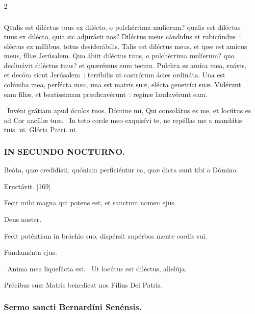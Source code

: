 \documentclass[9pt,twoside]{extarticle}
\begin{document}
\begin{multicols}{2}
{\subsubsection*{\center {}}
\lettrine{Q}ualis est diléctus tuus ex dilécto, o pulchérrima mulíerum? qualis est diléctus tuus ex dilécto, quia sic adjurásti nos?
Diléctus meus cándidus et rubicúndus~: eléctus ex míllibus, totus desiderábilis. Talis est diléctus meus, et ipse est amícus meus, fíliæ Jerúsalem.
Quo ábiit diléctus tuus, o pulchérrima mulíerum? quo declinávit diléctus tuus? et quærémus eum tecum.
Pulchra es amíca mea, suávis, et decóra sicut Jerúsalem~: terríbilis ut castrórum ácies ordináta.
Una est colúmba mea, perfécta mea, una est matris suæ, elécta genetríci suæ. Vidérunt eam fíliæ, et beatíssimam prædicavérunt~: regínæ laudavérunt eam.

\begin{tightlist}{}
\item {}~Invéni grátiam apud óculos tuos, Dómine mi, \textred{*} Qui consolátus es me, et locútus es ad Cor ancíllæ tuæ. ~In toto corde meo exquisívi te, ne repéllas me a mandátis tuis. ui. Glória Patri. ui.
\end{tightlist}

\subsubsection*{\center \textsc{IN SECUNDO NOCTURNO.}}
\begin{tightlist}{}
\item {} Beáta, quæ credidísti, quóniam perficiéntur ea, quæ dicta sunt tibi a Dómino.
\item {} Eructávit. [169]
\item {} Fecit mihi magna qui potens est, et sanctum nomen ejus.
\item {} Deus noster.
\item {} Fecit poténtiam in bráchio suo, dispérsit supérbos mente cordis sui.
\item {} Fundaménta ejus.
\item {}~Anima mea liquefácta est. ~Ut locútus est diléctus, allelúja.
\item {} Précibus suæ Matris benedícat nos Fílius Dei Patris.
\end{tightlist}

\subsubsection*{\center Sermo sancti Bernardíni Senénsis.}
}
\end{multicols}
\end{document}
